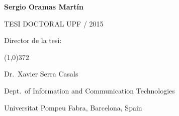 \begin{titlingpage}
\begin{flushright}
  \vspace*{2cm}

  {\Large \textbf{Sergio Oramas Martín}}

   
  \vspace*{\fill} 
  TESI DOCTORAL UPF / 2015

\end{flushright}
  
  \vspace*{1.5cm}

  Director de la tesi:

  \vspace*{-0.25cm}

  \line(1,0){372}
  
  \vspace*{0.25cm}

  Dr.~Xavier Serra Casals

  Dept.~of Information and Communication Technologies

  Universitat Pompeu Fabra, Barcelona, Spain
  
\end{titlingpage}

